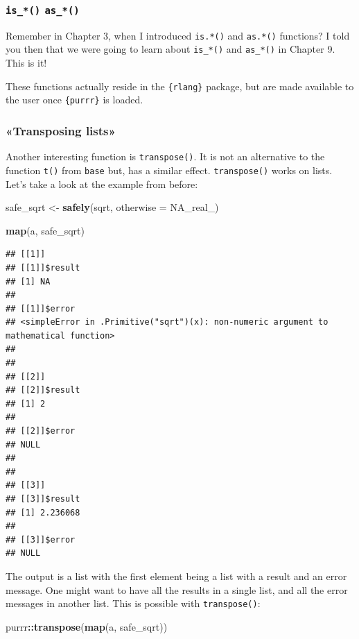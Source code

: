\documentclass[]{gitbook}
\newenvironment{Shaded}{\begin{snugshade}}{\end{snugshade}}
\newcommand{\DataTypeTok}[1]{\textcolor[rgb]{0.13,0.29,0.53}{#1}}
\newcommand{\KeywordTok}[1]{\textcolor[rgb]{0.13,0.29,0.53}{\textbf{#1}}}
\newcommand{\NormalTok}[1]{#1}
\newcommand{\OperatorTok}[1]{\textcolor[rgb]{0.81,0.36,0.00}{\textbf{#1}}}
\newcommand{\OtherTok}[1]{\textcolor[rgb]{0.56,0.35,0.01}{#1}}
\newcommand{\StringTok}[1]{\textcolor[rgb]{0.31,0.60,0.02}{#1}}
\begin{document}
\hypertarget{is_-as_}{%
\subsubsection{\texorpdfstring{\texttt{is\_*()} \texttt{as\_*()}}{is\_*() as\_*()}}\label{is_-as_}}

Remember in Chapter 3, when I introduced \texttt{is.*()} and \texttt{as.*()} functions? I told you then that we
were going to learn about \texttt{is\_*()} and \texttt{as\_*()} in Chapter 9. This is it!

These functions actually reside in the \texttt{\{rlang\}} package, but are made available to the user once
\texttt{\{purrr\}} is loaded.

\hypertarget{transposing-lists}{%
\subsubsection{«Transposing lists»}\label{transposing-lists}}

Another interesting function is \texttt{transpose()}. It is not an alternative to the function \texttt{t()} from
\texttt{base} but, has a similar effect. \texttt{transpose()} works on lists. Let's take a look at the example
from before:

\begin{Shaded}
\begin{Highlighting}[]
\NormalTok{safe_sqrt <-}\StringTok{ }\KeywordTok{safely}\NormalTok{(sqrt, }\DataTypeTok{otherwise =} \OtherTok{NA_real_}\NormalTok{)}

\KeywordTok{map}\NormalTok{(a, safe_sqrt)}
\end{Highlighting}
\end{Shaded}

\begin{verbatim}
## [[1]]
## [[1]]$result
## [1] NA
## 
## [[1]]$error
## <simpleError in .Primitive("sqrt")(x): non-numeric argument to mathematical function>
## 
## 
## [[2]]
## [[2]]$result
## [1] 2
## 
## [[2]]$error
## NULL
## 
## 
## [[3]]
## [[3]]$result
## [1] 2.236068
## 
## [[3]]$error
## NULL
\end{verbatim}

The output is a list with the first element being a list with a result and an error message. One
might want to have all the results in a single list, and all the error messages in another list.
This is possible with \texttt{transpose()}:

\begin{Shaded}
\begin{Highlighting}[]
\NormalTok{purrr}\OperatorTok{::}\KeywordTok{transpose}\NormalTok{(}\KeywordTok{map}\NormalTok{(a, safe_sqrt))}
\end{Highlighting}
\end{Shaded}
\end{document}
